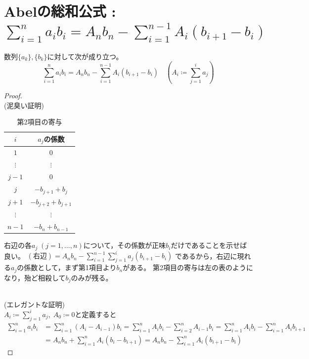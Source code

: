     \section{Abelの総和公式 : \texorpdfstring{$\sum_{i=1}^n a_ib_i = A_nb_n - \sum_{i=1}^{n-1}A_i(b_{i+1}-b_i)$}{Σ\_\{i=1\}\string^n a\_i b\_i = A\_n b\_n - Σ\_\{i=1\}\string^(n-1) A\_i(b\_(i+1) - b\_i)}}
        \begin{shadebox}
            数列$\{a_k\},\{b_k\}$に対して次が成り立つ。
            \[ \sum_{i=1}^n a_ib_i = A_nb_n - \sum_{i=1}^{n-1}A_i(b_{i+1}-b_i) \quad \left( A_i \coloneq \sum_{j=1}^i a_j \right) \]
        \end{shadebox}
        \begin{proof}
            \quad\\
            (泥臭い証明)\\
            \begin{minipage}{0.45\hsize}
                \begin{table}[H]
                    \centering
                    \caption{第2項目の寄与}
                    \begin{tabular}{cc}
                        $i$			& $a_j$の係数 \\\hline\hline
                        $1$			& $0$\\
                        $\vdots$	& $\vdots$\\
                        $j-1$		& $0$\\
                        $j$			& $-b_{j+1} + b_j$\\
                        $j+1$		& $-b_{j+2} + b_{j+1}$\\
                        $\vdots$	& $\vdots$\\
                        $n-1$		& $-b_n + b_{n-1}$\\\hline
                    \end{tabular}
                \end{table}
            \end{minipage}
            \begin{minipage}{0.45\hsize}
                右辺の各$a_j\;(j=1,\dotsc,n)$について，その係数が正味$b_i$だけであることを示せば良い。
                $(\text{右辺}) = A_nb_n - \sum_{i=1}^{n-1}\sum_{j=1}^ia_j(b_{i+1}-b_i)$
                であるから，右辺に現れる$a_j$の係数として，まず第1項目より$b_n$がある。
                第2項目の寄与は左の表のようになり，殆ど相殺して$b_j$のみが残る。
            \end{minipage}\\
            \newline
            (エレガントな証明)\\
            \quad $A_i \coloneq \sum_{j=1}^i a_j,\;A_0 \coloneq 0$と定義すると
            \begin{align*}
                \sum_{i=1}^n a_ib_i &= \sum_{i=1}^n (A_i-A_{i-1})b_i = \sum_{i=1}^n A_ib_i - \sum_{i=2}^n A_{i-1}b_i = \sum_{i=1}^n A_ib_i - \sum_{i=1}^n A_{i}b_{i+1} \\
                &= A_nb_n + \sum_{i=1}^n A_i(b_i-b_{i+1}) = A_nb_n - \sum_{i=1}^n A_i(b_{i+1} - b_i)
            \end{align*}
        \end{proof}
